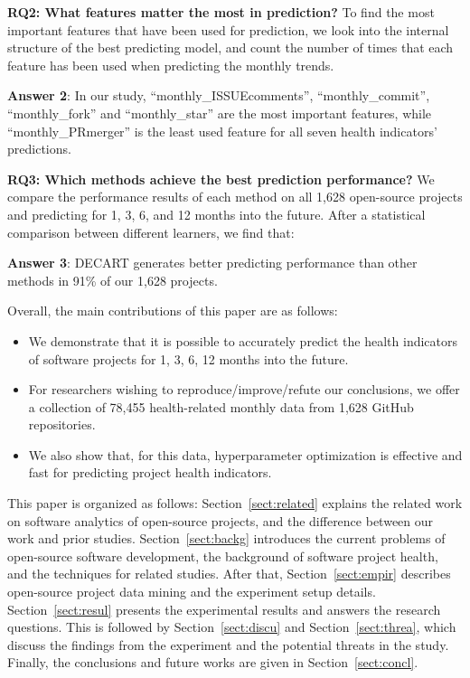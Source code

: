 \documentclass[sigconf,anonymous,review]{acmart}
\newcommand{\bi}{\begin{itemize}}
\newcommand{\ei}{\end{itemize}}
\begin{document}
\textbf{RQ2: What features matter the most in prediction?}
To find the most important features that have been used for prediction, we look into the internal structure of the best predicting model, and count the number of times that each feature has been used when predicting the monthly trends.


\begin{blockquote}
\noindent
\textbf{Answer 2}: In our study, ``monthly\_ISSUEcomments'', ``monthly\_commit'', ``monthly\_fork'' and ``monthly\_star'' are the most important features, while ``monthly\_PRmerger'' is the least used feature for all seven health indicators' predictions.
\end{blockquote}



\textbf{RQ3: Which methods achieve the best prediction performance?}
We compare the performance results of each method on all 1,628 open-source projects and predicting for 1, 3, 6, and 12 months into the future. After a statistical comparison between different learners, we find that:  

\begin{blockquote}
\noindent
\textbf{Answer 3}: DECART generates better predicting performance than other methods in 91\% of our 1,628 projects.
\end{blockquote}



 
Overall, the main contributions of this paper are as follows:
\bi
\item  
We demonstrate that it is possible to accurately  predict the health indicators of software projects for 1, 3, 6, 12 months into the future.
\item For  researchers wishing to reproduce/improve/refute our conclusions, we offer a  collection of 78,455 health-related monthly data from 1,628 GitHub repositories. 
\item We also show that, for this data, hyperparameter optimization is effective and fast for predicting project health indicators.

\ei 
 

  
 
 
This paper is organized as follows:
Section~\ref{sect:related} explains the related work on software analytics of open-source projects, and the difference between our work and prior studies.
Section~\ref{sect:backg} introduces the current problems of open-source software development, the background of software project health, and the techniques for related studies.
After that, Section~\ref{sect:empir} describes open-source project data mining and the experiment setup details. 
Section~\ref{sect:resul} presents the experimental results and answers the research questions. 
This is followed by Section~\ref{sect:discu} and Section~\ref{sect:threa}, which discuss the findings from the experiment and the potential threats in the study. 
Finally, the conclusions and future works are given in Section~\ref{sect:concl}.
\end{document}
